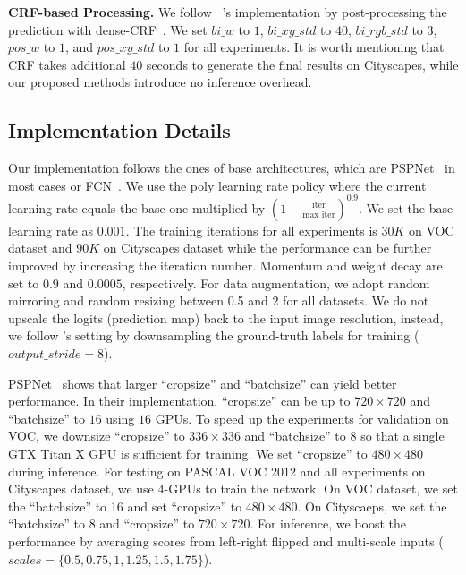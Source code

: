 \noindent 
\textbf{CRF-based Processing.} 
We follow ~\cite{chen2016deeplab}'s implementation by post-processing the prediction with dense-CRF~\cite{krahenbuhl2011efficient}. We set $bi\_w$ to $1$, $bi\_xy\_std$ to $40$, $bi\_rgb\_std$ to $3$, $pos\_w$ to $1$, and $pos\_xy\_std$ to $1$ for all experiments. It is worth mentioning that CRF takes additional $40$ seconds to generate the final results on Cityscapes, while our proposed methods introduce no inference overhead.

\subsection{Implementation Details}
\label{subsec:imp_details}

Our implementation follows the ones of base architectures, which are PSPNet~\cite{zhao2016pyramid} in most cases or FCN~\cite{long2015fully}. We use the poly learning rate policy where the current learning rate equals the base one multiplied by  $(1-\frac{\text{iter}}{\text{max\_iter}})^{0.9}$. We set the base learning rate as $0.001$. The training iterations for all experiments is $30K$ on VOC dataset and $90K$ on Cityscapes dataset while the performance can be further improved by increasing the iteration number. Momentum and weight decay are set to $0.9$ and $0.0005$, respectively.  For data augmentation, we adopt random mirroring and random resizing between 0.5 and 2 for all
datasets. We do not upscale the logits (prediction map) back to the input image resolution, instead, we follow \cite{chen2016deeplab}'s setting by downsampling the ground-truth labels for training ($output\_stride=8$).

PSPNet~\cite{zhao2016pyramid} shows that larger ``cropsize'' and ``batchsize'' can yield better performance. In their implementation, ``cropsize'' can be up to $720\times 720$ and ``batchsize'' to $16$ using $16$ GPUs. To speed up the experiments for validation on VOC, we downsize ``cropsize'' to $336\times 336$ and ``batchsize'' to $8$ so that a single GTX Titan X GPU is sufficient for training.  We set ``cropsize'' to $480\times 480$ during inference. For testing on PASCAL VOC 2012 and all experiments on Cityscapes dataset, we use $4$-GPUs to train the network. On VOC dataset, we set the ``batchsize'' to 16 and set ``cropsize'' to $480 \times 480$. On Cityscaeps, we set the ``batchsize'' to 8 and ``cropsize'' to $720 \times 720$. For inference, we boost the performance by averaging scores from left-right flipped and multi-scale inputs ($scales = \{0.5,0.75,1,1.25,1.5,1.75\}$). 

